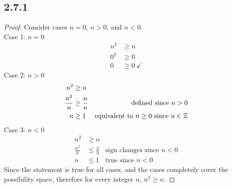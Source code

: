 





\subsection*{2.7.1}
\begin{enumerate}
  \begin{proof}
    Consider cases $n = 0$, $n > 0$, and $n < 0$. \\
    Case 1: $n=0$
    \begin{align*}
      n^2 & \geq n            \\
      0^2 & \geq 0            \\
      0   & \geq 0~\checkmark
    \end{align*}
    Case 2: $n > 0$
    \begin{align*}
      n^2           & \geq n                                                                  \\
      \frac{n^2}{n} & \geq \frac{n}{n} & \text{defined since $n > 0$}                         \\
      n             & \geq 1           & \text{equivalent to $n \geq 0$ since $n \in \mathbb{Z}$}
    \end{align*}
    Case 3: $n < 0$
    \begin{align*}
      n^2           & \geq n                                               \\
      \frac{n^2}{n} & \leq \frac{n}{n} & \text{sign changes since $n < 0$} \\
      n             & \leq 1           & \text{true since $n < 0$}
    \end{align*}
    Since the statement is true for all cases, and the cases completely cover the possibility space, therefore for every integer $n$, $n^2 \geq n$.
  \end{proof}
\end{enumerate}

